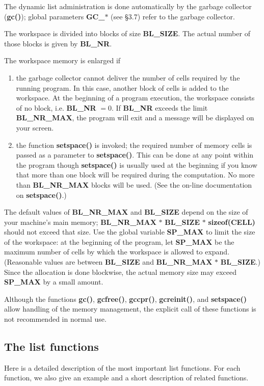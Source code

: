 The dynamic list administration is done automatically by the garbage collector ({\bf gc()}); global parameters
{\bf GC\_$*$} (see \S 3.7) refer to the garbage collector.

\newpage

The workspace is divided into blocks of size {\bf BL\_SIZE}. The actual number of those blocks is given by
{\bf BL\_NR}.

The workspace memory is enlarged if
\begin{enumerate}
\item
the garbage collector cannot deliver the number of cells required by the running program. In this case, another block
of cells is added to the workspace. At the beginning of a program execution, the workspace consists of
no block, i.e.\/ {\bf BL\_NR} $ = 0$. If {\bf BL\_NR} exceeds the limit {\bf BL\_NR\_MAX}, the program 
will exit and a message will be displayed on your screen.
\item
the function {\bf setspace()} is invoked; the required number of memory cells is passed as a parameter to
{\bf setspace()}. This can be done at any point within the program though {\bf setspace()} is usually used
at the beginning if you know that more than one block will be required during the computation.
No more than {\bf BL\_NR\_MAX} blocks will be used. (See the on-line documentation on {\bf setspace()}.)
\end{enumerate}

The default values of {\bf BL\_NR\_MAX} and {\bf BL\_SIZE} depend on the size of your machine's main memory;
{\bf BL\_NR\_MAX} $*$ {\bf BL\_SIZE} $*$ {\bf sizeof(CELL)} should not exceed that size. Use the global
variable {\bf SP\_MAX} to limit the size of the workspace: at the beginning of the program, let {\bf SP\_MAX}
be the maximum number of cells by which the workspace is allowed to expand. (Reasonable values are between
{\bf BL\_SIZE} and {\bf BL\_NR\_MAX} $*$ {\bf BL\_SIZE}.) Since the allocation is done blockwise, the actual
memory size may exceed {\bf SP\_MAX} by a small amount.

Although the functions {\bf gc()}, {\bf gcfree()}, {\bf gccpr()}, 
{\bf gcreinit()}, and {\bf setspace()} allow handling of the memory management,
the explicit call of these functions is not recommended in normal use.

\newpage

\subsection{The list functions}
Here is a detailed description of the most important list functions. For each function, we also give an
example and a short description of related functions.

